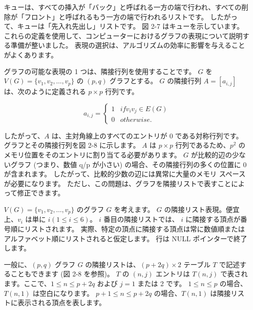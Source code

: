 
キューは、すべての挿入が「バック」と呼ばれる一方の端で行われ、すべての削除が「フロント」と呼ばれるもう一方の端で行われるリストです。 したがって、キューは「先入れ先出し」リストです。 図 2-7 はキューを示しています。
これらの定義を使用して、コンピューターにおけるグラフの表現について説明する準備が整いました。 表現の選択は、アルゴリズムの効率に影響を与えることがよくあります。

グラフの可能な表現の 1 つは、隣接行列を使用することです。 
$G$ を $V(G) = \{v_1, v_2, \dots, v_p\}$ の $(p, q)$ グラフとする。 
$G$ の隣接行列 $A = [a_{i,j}] $ は、次のように定義される $p\times p$ 行列です。

\begin{equation}
  a_{i,j}=
  \begin{cases}
    1  & if v_iv_j \in E(G) \\
    0  & otherwise.
  \end{cases}
\end{equation}

したがって、$A$ は、主対角線上のすべてのエントリが 0 である対称行列です。 グラフとその隣接行列を図 2-8 に示します。
$A$ は $p \times p$ 行列であるため、$p^2$ のメモリ位置をそのエントリに割り当てる必要があります。
$G$ が比較的辺の少ないグラフ (つまり、数値 q/p が小さい) の場合、その隣接行列の多くの位置に 0 が含まれます。
したがって、比較的少数の辺には異常に大量のメモリ スペースが必要になります。 
ただし、この問題は、グラフを隣接リストで表すことによって修正できます。

$V(G) = \{v_1, v_2, \dots, v_p \}$ のグラフ $G$ を考えます。 
$G$ の隣接リスト表現。便宜上、$v_i$ は単に $i ( 1 \leq i \leq 6)$。 $i$ 番目の隣接リストでは、
$i$ に隣接する頂点が番号順にリストされます。 実際、特定の頂点に隣接する頂点は常に数値順または
アルファベット順にリストされると仮定します。 行は NULL ポインターで終了します。

一般に、$(p, q)$ グラフ $G$ の隣接リストは、$(p+2q)\times 2$ テーブル $T$ で記述することもできます (図 2-8 を参照)。
$T$ の $(n, j)$ エントリは $T(n,j)$ で表されます。ここで、$1 \leq n \leq p+2q$ および $j = 1$ または 2 です。
$1 \leq n \leq p$ の場合、$T(n, 1)$ は空白になります。 $p+1 \leq n \leq p+2q$ の場合、$T(n,1)$ は隣接リストに表示される頂点を表します。